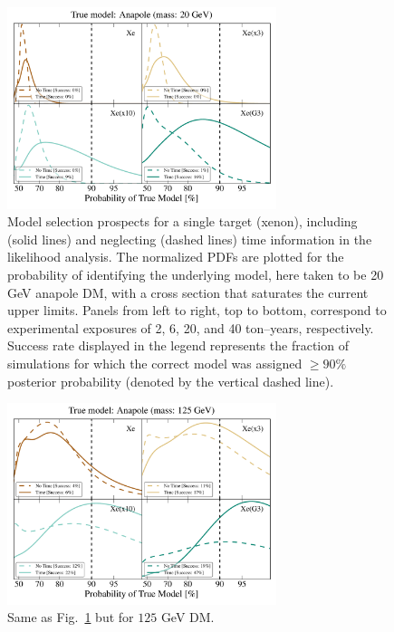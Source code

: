 \documentclass[11pt]{article}
\begin{document}
\begin{figure}
\centering
\includegraphics[width=0.7\textwidth]{plots/PDF_20GeV_Anapole_50sims_Xe_Xe3x_Xe10x_XeG3_GF_TNT.pdf}
\caption{\label{fig:20gev_anapole_XeFull_TNT_GF}
Model selection prospects for a single target (xenon), including (solid lines) and neglecting (dashed lines) time information in the likelihood analysis. The normalized PDFs are plotted for the probability of identifying the underlying model, here taken to be 20 GeV anapole DM, with a cross section that saturates the current upper limits. Panels from left to right, top to bottom, correspond to experimental exposures of 2, 6, 20, and 40 ton--years, respectively. Success rate displayed in the legend represents the fraction of simulations for which the correct model was assigned $ \geq 90\%$ posterior probability (denoted by the vertical dashed line).}
\end{figure}
\begin{figure}
\centering
\includegraphics[width=0.7\textwidth]{plots/PDF_125GeV_Anapole_50sims_Xe_Xe3x_Xe10x_XeG3_GF_TNT.pdf}
\caption{\label{fig:125gev_anapole_XeFull_TNT_GF}
Same as Fig.~\ref{fig:20gev_anapole_XeFull_TNT_GF} but for $125$ GeV DM.}
\end{figure}
\end{document}
